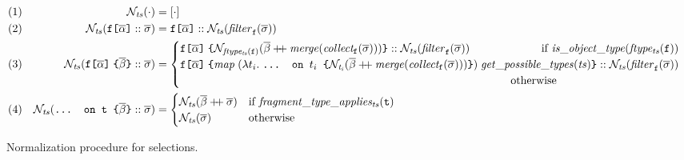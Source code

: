 \begin{figure*}[t]
\small
    \centering
    \begin{align*}
    & (1) & \tnorm{\cdot} &= [\cdot] \\
    & (2) & \tnorm{\fld :: \sset} &= 
       	\fld :: \tnorm{\filter{\sset}{\fkey}} \\      
    & (3) & \tnorm{\nfld{\overline{\beta}} :: \sset} &=
    \begin{cases}
        \nfld{\norm{ftype_{ts}(\fkey)}{\overline{\beta} \mdoubleplus \mathit{merge (collect_\fkey (\sset))}}} :: \tnorm{\filter{\sset}{\fkey}} \hfill \text{ if } 
	            \mathit{is\_object\_type (ftype_{ts} (\fkey))}\\
    \nfld{\mathit{map}\; (\lambda t_{i}.\; \ifrag{$t_{i}$}{\norm{t_{i}}{\overline{\beta} \mdoubleplus \mathit{merge (collect_{\fkey} (\sset))}}})\; \mathit{get\_possible\_types (ts)}} 
    		:: \tnorm{\filter{\sset}{\fkey}} \\
		\quad\quad\quad\quad\quad\quad\quad\quad\quad\quad\quad\quad\quad\quad\quad\quad\quad\quad\quad\quad\quad\quad\quad\quad\quad\quad\quad\quad\quad\; \text{ otherwise } 
    \end{cases}\\
    & (4) & \tnorm{\ifrag{t}{\overline{\beta}} :: \sset} &= 
    \begin{cases}
    \tnorm{\overline{\beta} \mdoubleplus \sset} & 
    \text{if }\mathit{fragment\_type\_applies_{ts}(\texttt{t})}\\
    \tnorm{\sset} & \text{otherwise}
    \end{cases}
    \end{align*}
    \caption{Normalization procedure for \gql selections. 
    }
\label{fig:normalize}
\end{figure*}

